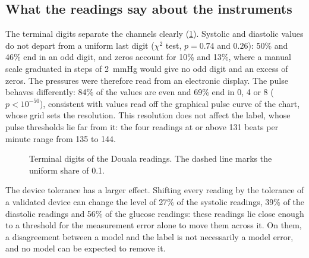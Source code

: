 \subsection{What the readings say about the instruments}

The terminal digits separate the channels clearly (\cref{fig:terminal-digits}). Systolic and diastolic values do not depart from a uniform last digit ($\chi^2$ test, $p = 0.74$ and $0.26$): 50\% and 46\% end in an odd digit, and zeros account for 10\% and 13\%, where a manual scale graduated in steps of 2~mmHg would give no odd digit and an excess of zeros. The pressures were therefore read from an electronic display. The pulse behaves differently: 84\% of the values are even and 69\% end in 0, 4 or 8 ($p < 10^{-50}$), consistent with values read off the graphical pulse curve of the chart, whose grid sets the resolution. This resolution does not affect the label, whose pulse thresholds lie far from it: the four readings at or above 131 beats per minute range from 135 to 144.

\begin{figure}[htbp]
\centering
{}
\caption{Terminal digits of the Douala readings. The dashed line marks the uniform share of 0.1.}\label{fig:terminal-digits}
\end{figure}

The device tolerance has a larger effect. Shifting every reading by the tolerance of a validated device can change the level of 27\% of the systolic readings, 39\% of the diastolic readings and 56\% of the glucose readings: these readings lie close enough to a threshold for the measurement error alone to move them across it. On them, a disagreement between a model and the label is not necessarily a model error, and no model can be expected to remove it.

